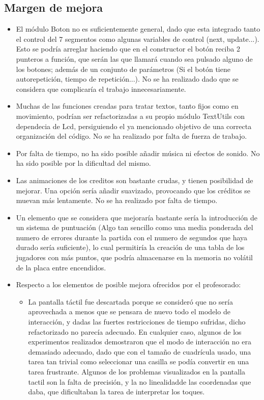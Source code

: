\documentclass[12pt,letterpaper]{article}
\begin{document}
\subsection{Margen de mejora}
\label{sec:mejora}
\begin{itemize}
  \item El módulo Boton no es suficientemente general, dado que esta
    integrado tanto el control del 7 segmentos como algunas variables
    de control (next, update...). Esto se podría arreglar haciendo que
    en el constructor el botón reciba 2 punteros a función, que serán
    las que llamará cuando sea pulsado alguno de los botones; además
    de un conjunto de parámetros (Si el botón tiene autorepetición,
    tiempo de repetición...). No se ha realizado dado que se considera
    que complicaría el trabajo innecesariamente.
  \item Muchas de las funciones creadas para tratar textos, tanto
    fijos como en movimiento, podrían ser refactorizadas a su propio
    módulo TextUtils con dependecia de Lcd, persiguiendo el ya
    mencionado objetivo de una correcta organización del código. No se
    ha realizado por falta de fuerza de trabajo.
  \item Por falta de tiempo, no ha sido posible añadir música ni
    efectos de sonido. No ha sido posible por la dificultad del mismo.
  \item Las animaciones de los creditos son bastante crudas, y tienen
    posibilidad de mejorar. Una opción sería añadir suavizado,
    provocando que los créditos se muevan más lentamente. No se ha
    realizado por falta de tiempo.
  \item Un elemento que se considera que mejoraría bastante sería la
    introducción de un sistema de puntuación (Algo tan sencillo como
    una media ponderada del numero de errores durante la partida con
    el numero de segundos que haya durado sería suficiente), lo cual
    permitiría la creación de una tabla de los jugadores con más
    puntos, que podría almacenarse en la memoria no volátil de la
    placa entre encendidos.
  \item Respecto a los elementos de posible mejora ofrecidos por el
    profesorado:
    \begin{itemize}
    \item La pantalla táctil fue descartada porque se consideró que no
      sería aprovechada a menos que se pensara de nuevo todo el modelo
      de interacción, y dadas las fuertes restricciones de tiempo
      sufridas, dicho refactorizado no parecía adecuado. En cualquier
      caso, algunos de los experimentos realizados demostraron que el
      modo de interacción no era demasiado adecuado, dado que con el
      tamaño de cuadrícula usado, una tarea tan trivial como
      seleccionar una casilla se podía convertir en una tarea
      frustrante. Algunos de los problemas visualizados en la pantalla
      tactil son la falta de precisión, y la no
      linealidad\footnotemark[1] de las coordenadas que daba, que
      dificultaban la tarea de interpretar los toques.


\end{itemize}
\end{itemize}
\end{document}
